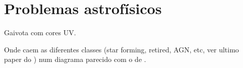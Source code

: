 



\chapter{Problemas astrofísicos}
\label{sec:Problemas}

Gaivota com cores UV.

Onde caem as diferentes classes (star forming, retired, AGN, etc, ver ultimo
paper do \citet{CidFernandes2011}) num diagrama parecido com o de
\citet{Chilingarian2011}.



